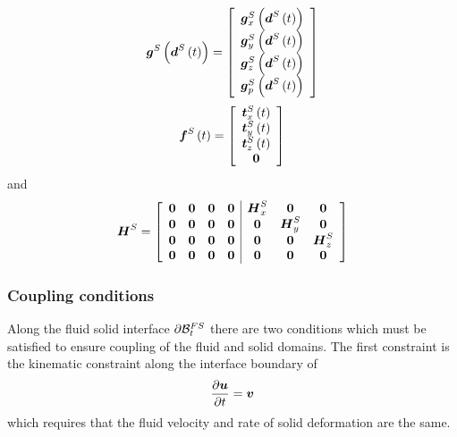 \begin{equation}
   \boldsymbol{g}^{S}\left(  \boldsymbol{d}^{S}\left( t \right)  \right) =\left[\begin{array}{c}
   \boldsymbol{g}^{S}_{x}\left(  \boldsymbol{d}^{S}\left( t \right)  \right)  \\
   \boldsymbol{g}^{S}_{y}\left(  \boldsymbol{d}^{S}\left( t \right)  \right)  \\
   \boldsymbol{g}^{S}_{z}\left(  \boldsymbol{d}^{S}\left( t \right)  \right)  \\
   \boldsymbol{g}^{S}_{p}\left(  \boldsymbol{d}^{S}\left( t \right)  \right) 
  \end{array}\right]
\end{equation}
\begin{equation}
   \boldsymbol{f}^{S}\left( t \right) =\left[\begin{array}{c}
   \boldsymbol{t}^{S}_{x}\left( t \right)  \\
   \boldsymbol{t}^{S}_{y}\left( t \right)  \\
   \boldsymbol{t}^{S}_{z}\left( t \right)  \\
  \boldsymbol{0}
  \end{array}\right]
\end{equation}
and
\begin{equation}
  \matr{H}^{S}=\left[\begin{array}{cccc|ccc}
    \matr{0} & \matr{0} & \matr{0} & \matr{0} & \matr{H}^{S}_{x} & \matr{0} & \matr{0} \\
    \matr{0} & \matr{0} & \matr{0} & \matr{0} & \matr{0} & \matr{H}^{S}_{y} & \matr{0} \\
    \matr{0} & \matr{0} & \matr{0} & \matr{0} & \matr{0} & \matr{0} & \matr{H}^{S}_{z} \\
    \matr{0} & \matr{0} & \matr{0} & \matr{0} & \matr{0} & \matr{0} & \matr{0}
  \end{array}\right]
\end{equation}

\subsubsection{Coupling conditions}

Along the fluid solid interface $ \partial{\ensuremath{ \mathcal{B} }} _{t}^{FS}$ there
are two conditions which must be satisfied to ensure coupling of the fluid and
solid domains. The first constraint is the kinematic constraint along the
interface boundary of
\begin{equation}
  \delby{\vectr{u}}{t}=\vectr{v} \label{eqn:FSIKinematicConstraint}
\end{equation}
which requires that the fluid velocity and rate of solid deformation are the
same.


